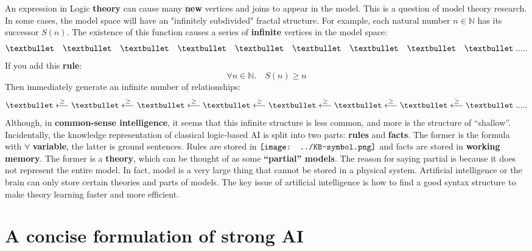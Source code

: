 \documentclass[12pt, orivec]{article}
\newcommand*\KB{\vcenter{\hbox{\texttt{[image: ../KB-symbol.png]}}}}
\begin{document}
An expression in Logic \textbf{theory} can cause many \textbf{new} vertices and joins to appear in the model. This is a question of model theory research. In some cases, the model space will have an "infinitely subdivided" fractal structure.
For example, each natural number $n \in \mathbb{N}$ has its successor $S(n)$. The existence of this function causes a series of \textbf{infinite} vertices in the model space:
\begin{equation}
\textbullet \quad \textbullet \quad \textbullet \quad \textbullet \quad \textbullet \quad \textbullet \quad \textbullet \quad \textbullet \quad \textbullet \; .....
\end{equation}
If you add this \textbf{rule}:\begin{equation}
\forall n \in \mathbb{N}. \quad S(n) \ge n
\end{equation}
Then immediately generate an infinite number of relationships:
\begin{equation}
\textbullet \stackrel{\ge}{\longleftarrow} \textbullet \stackrel{\ge}{\longleftarrow} \textbullet \stackrel{\ge}{\longleftarrow} \textbullet \stackrel{\ge}{\longleftarrow} \textbullet \stackrel{\ge}{\longleftarrow} \textbullet \stackrel{\ge}{\longleftarrow} \textbullet \stackrel{\ge}{\longleftarrow} \textbullet \; .....
\end{equation}
Although, in \textbf{common-sense intelligence}, it seems that this infinite structure is less common, and more is the structure of ``shallow''.
\footnotesize
Incidentally, the knowledge representation of classical logic-based AI is split into two parts: \textbf{rules} and \textbf{facts}. The former is the formula with $\forall$ \textbf{variable}, the latter is ground sentences. Rules are stored in $\KB$ and facts are stored in \textbf{working memory}. The former is a \textbf{theory}, which can be thought of as some \textbf{``partial'' models}. The reason for saying partial is because it does not represent the entire model. In fact, model is a very large thing that cannot be stored in a physical system. Artificial intelligence or the brain can only store certain theories and parts of models. The key issue of artificial intelligence is how to find a good syntax structure to make theory learning faster and more efficient.\normalsize

\section{A concise formulation of strong AI}
\end{document}
